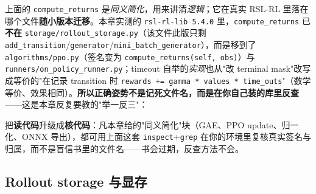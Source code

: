 \begin{note}
上面的 \verb|compute_returns| 是\emph{同义简化}，用来讲清\emph{逻辑}；它在真实 RSL-RL 里落在哪个文件\textbf{随小版本迁移}。本章实测的 \verb|rsl-rl-lib 5.4.0| 里，\verb|compute_returns| 已\textbf{不在} \verb|storage/rollout_storage.py|（该文件此版只剩 \verb|add_transition|/\verb|generator|/\verb|mini_batch_generator|），而是移到了 \verb|algorithms/ppo.py|（签名变为 \verb|compute_returns(self, obs)|）与 \verb|runners/on_policy_runner.py|；timeout 自举的\emph{实现}也从"改 terminal mask"改写成等价的"在记录 transition 时 \verb|rewards += gamma * values * time_outs|"（数学等价、效果相同）。\textbf{所以正确姿势不是记死文件名，而是在你自己装的库里反查}——这是本章反复要教的"举一反三"：
把\textbf{读代码}升级成\textbf{核代码}：凡本章给的"同义简化"块（GAE、PPO update、归一化、ONNX 导出），都可用上面这套 \verb|inspect|+\verb|grep| 在你的环境里复核真实签名与归属，而不是盲信书里的文件名——书会过期，反查方法不会。
\end{note}

\subsection{Rollout storage 与显存}

